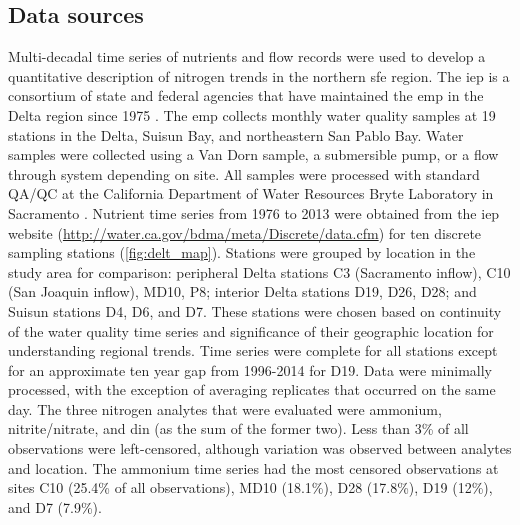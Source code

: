 \documentclass[journal = esthag, manuscript = article]{achemso}\usepackage[]{graphicx}\usepackage[]{color}
\begin{document}
\subsection{Data sources}



Multi-decadal time series of nutrients and flow records were used to develop a quantitative description of nitrogen trends in the northern \ac{sfe} region.  The \ac{iep} is a consortium of state and federal agencies that have maintained the \ac{emp} in the Delta region since 1975 \cite{IEP13}.  The \ac{emp} collects monthly water quality samples at 19 stations in the Delta, Suisun Bay, and northeastern San Pablo Bay.  Water samples were collected using a Van Dorn sample, a submersible pump, or a flow through system depending on site.  All samples were processed with standard QA/QC at the California Department of Water Resources Bryte Laboratory in Sacramento \cite{IEP13}.  Nutrient time series from 1976 to 2013 were obtained from the \ac{iep} website (\url{http://water.ca.gov/bdma/meta/Discrete/data.cfm}) for ten discrete sampling stations (\cref{fig:delt_map}).  Stations were grouped by location in the study area for comparison: peripheral Delta stations C3 (Sacramento inflow), C10 (San Joaquin inflow), MD10, P8; interior Delta stations D19, D26, D28; and Suisun stations D4, D6, and D7.  These stations were chosen based on continuity of the water quality time series and significance of their geographic location for understanding regional trends.  Time series were complete for all stations except for an approximate ten year gap from 1996-2014 for D19.  Data were minimally processed, with the exception of averaging replicates that occurred on the same day.  The three nitrogen analytes that were evaluated were ammonium, nitrite/nitrate, and \ac{din} (as the sum of the former two). Less than 3\% of all observations were left-censored, although variation was observed between analytes and location.  The ammonium time series had the most censored observations at sites C10 (25.4\% of all observations), MD10 (18.1\%), D28 (17.8\%), D19 (12\%), and D7 (7.9\%).
\end{document}
